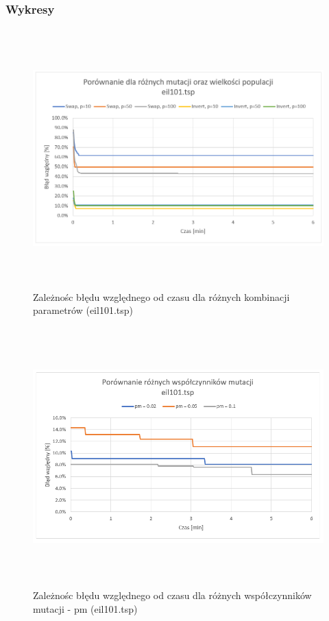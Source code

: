 \documentclass[a4paper,11pt]{article}
\begin{document}
\newpage
\subsubsection{Wykresy}

\begin{figure}[H]
\centering
\includegraphics[height=10cm]{w1.PNG}
\caption{Zależnośc błędu względnego od czasu dla różnych kombinacji parametrów (eil101.tsp)}
\end{figure}

\begin{figure}[H]
\centering
\includegraphics[height=10cm]{w4.PNG}
\caption{Zależnośc błędu względnego od czasu dla różnych współczynników mutacji - pm (eil101.tsp)}
\end{figure}
\end{document}
